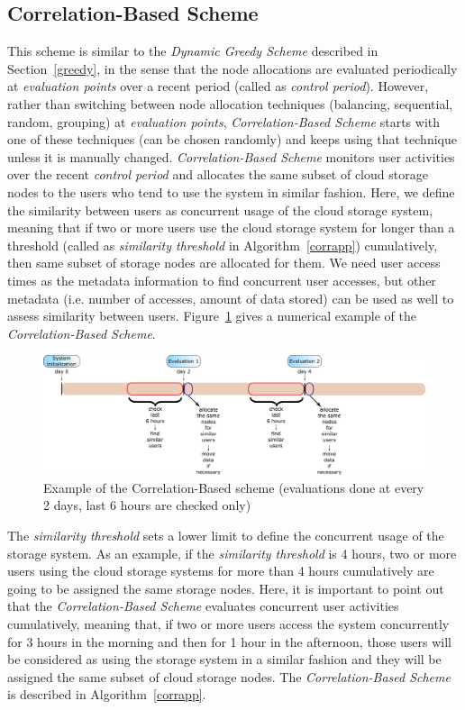 \subsection{Correlation-Based Scheme}
\label{correlation}
This scheme is similar to the \textit{Dynamic Greedy Scheme} described in Section~\ref{greedy}, in the sense that
the node allocations are evaluated periodically at \textit{evaluation points} over a recent period (called
as \textit{control period}). However, rather than switching between node allocation
techniques (balancing, sequential, random, grouping) at \textit{evaluation points}, \textit{Correlation-Based Scheme}
starts with one of these techniques (can be chosen randomly) and keeps using that technique unless it is manually
changed. \textit{Correlation-Based Scheme} monitors user activities over the recent \textit{control period} and
allocates the same subset of cloud storage nodes to the users who tend to use the system in similar fashion.
Here, we define the similarity between users as concurrent usage of the cloud storage system, meaning that if
two or more users use the cloud storage system for longer than a threshold (called as \textit{similarity threshold}
in Algorithm~\ref{corrapp}) cumulatively, then same subset of storage nodes are allocated for them. We need
user access times as the metadata information to find concurrent user accesses, but other metadata (i.e.
number of accesses, amount of data stored) can be used as well to assess similarity between users.
Figure~\ref{correlation_examples} gives a numerical example of the \textit{Correlation-Based Scheme}.

\begin{figure}[!htbp]
\centering
\includegraphics[width=\columnwidth,keepaspectratio]{FIG4.pdf}
\caption{Example of the Correlation-Based scheme (evaluations done at every 2 days, last 6 hours are checked only)}
\label{correlation_examples}
\end{figure}

The \textit{similarity threshold} sets a lower limit to define the concurrent usage of the storage system. As
an example, if the \textit{similarity threshold} is 4 hours, two or more users using the cloud storage systems
for more than 4 hours cumulatively are going to be assigned the same storage nodes. Here, it is important to point
out that the \textit{Correlation-Based Scheme} evaluates concurrent user activities cumulatively, meaning that, if
two or more users access the system concurrently for 3 hours in the morning and then for 1 hour in the afternoon,
those users will be considered as using the storage system in a similar fashion and they will be assigned the
same subset of cloud storage nodes. The \textit{Correlation-Based Scheme} is described in
Algorithm~\ref{corrapp}. 

